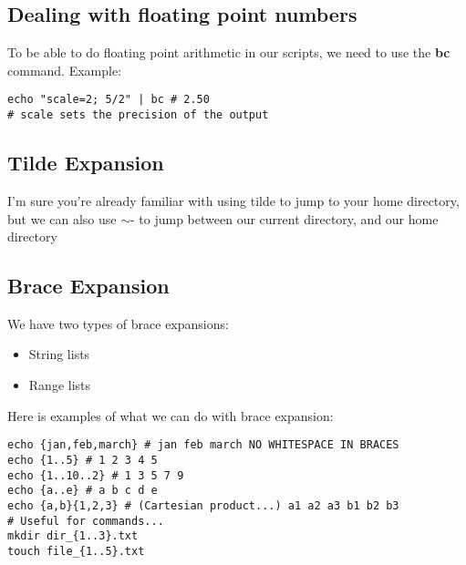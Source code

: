 \documentclass{report}
\begin{document}
    \bigbreak \noindent 
    \subsection{Dealing with floating point numbers}
    \bigbreak \noindent 
    To be able to do floating point arithmetic in our scripts, we need to use the \textbf{bc} command.
    \bigbreak \noindent 
    Example:
    \begin{mdframed}[style=purplebox]
    \begin{verbatim}
echo "scale=2; 5/2" | bc # 2.50
# scale sets the precision of the output
    \end{verbatim}
    \bigbreak \noindent
    \end{mdframed}
    \bigbreak \noindent 

    \pagebreak \bigbreak \noindent 
    \subsection{Tilde Expansion}
    \bigbreak \noindent 
    I'm sure you're already familiar with using tilde to jump to your home directory, but we can also use $\sim$- to jump between our current directory, and our home directory

    \bigbreak \noindent 
    \subsection{Brace Expansion}
    \bigbreak \noindent 
    We have two types of brace expansions:
    \begin{itemize}
        \item String lists
        \item Range lists
    \end{itemize}
    \bigbreak \noindent 
    Here is examples of what we can do with brace expansion:
    \bigbreak \noindent 
    \begin{mdframed}[style=purplebox]
    \begin{verbatim}
echo {jan,feb,march} # jan feb march NO WHITESPACE IN BRACES
echo {1..5} # 1 2 3 4 5
echo {1..10..2} # 1 3 5 7 9
echo {a..e} # a b c d e
echo {a,b}{1,2,3} # (Cartesian product...) a1 a2 a3 b1 b2 b3
# Useful for commands...
mkdir dir_{1..3}.txt
touch file_{1..5}.txt
    \end{verbatim}
    \bigbreak \noindent
    \end{mdframed}

    \pagebreak \bigbreak \noindent 
\end{document}
